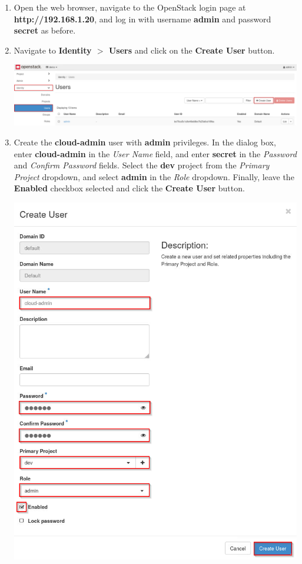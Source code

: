 \documentclass[letterpaper, 12pt]{article}
\begin{document}
\begin{enumerate}
    \item Open the web browser, navigate to the OpenStack login page at \textbf{http://192.168.1.20}, and log in with
    username \textbf{admin} and password \textbf{secret} as before.

    \item Navigate to \textbf{Identity $>$ Users} and click on the \textbf{Create User} button.
    
    \begin{center}
        \includegraphics[width=\linewidth]{images/part5/step2.png}
    \end{center}

    \item Create the \textbf{cloud-admin} user with \textbf{admin} privileges. In the dialog box, enter
    \textbf{cloud-admin} in the \textit{User Name} field, and enter \textbf{secret} in the \textit{Password} and
    \textit{Confirm Password} fields. Select the \textbf{dev} project from the \textit{Primary Project} dropdown, and
    select \textbf{admin} in the \textit{Role} dropdown. Finally, leave the \textbf{Enabled} checkbox selected and click
    the \textbf{Create User} button.

    \begin{center}
        \includegraphics[width=\linewidth]{images/part5/step3.png}
    \end{center}


\end{enumerate}
\end{document}
